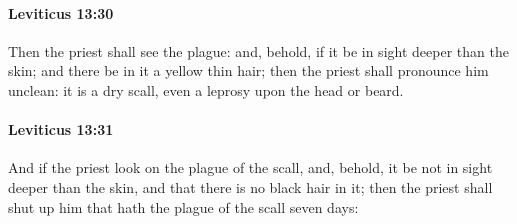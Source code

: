		\paragraph{Leviticus 13:30} %
			\label{LEVITICUS-13-30}

			Then the priest shall see the plague: and, behold, if it be in sight deeper than the skin; and there be in it a yellow thin hair; then the priest shall pronounce him unclean: it is a dry scall, even a leprosy upon the head or beard.


		\paragraph{Leviticus 13:31} %
			\label{LEVITICUS-13-31}

			And if the priest look on the plague of the scall, and, behold, it be not in sight deeper than the skin, and that there is no black hair in it; then the priest shall shut up him that hath the plague of the scall seven days:

